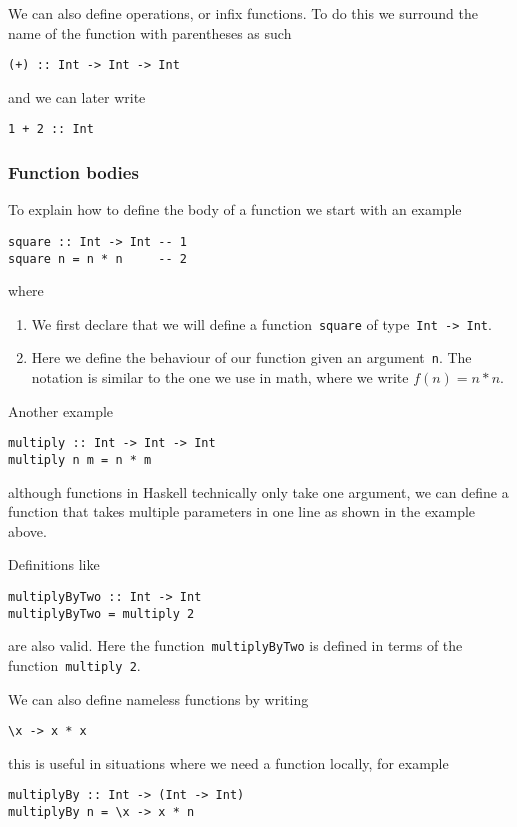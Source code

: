 \documentclass[../TFG.tex]{subfiles}
\begin{document}
We can also define operations, or infix functions. To do this we surround the
name of the function with parentheses as such
\begin{verbatim}
(+) :: Int -> Int -> Int
\end{verbatim}
and we can later write
\begin{verbatim}
1 + 2 :: Int
\end{verbatim}

\subsubsection{Function bodies}
To explain how to define the body of a function we start with an example
\begin{verbatim}
square :: Int -> Int -- 1
square n = n * n     -- 2
\end{verbatim}
where
\begin{enumerate}
    \item We first declare that we will define a
        function~\texttt{square} of
        type~\texttt{Int -> Int}.
    \item Here we define the behaviour of our function given an
        argument~\texttt{n}. The notation is similar to the one
        we use in math, where we write \(f(n) = n*n\).
\end{enumerate}
Another example
\begin{verbatim}
multiply :: Int -> Int -> Int
multiply n m = n * m
\end{verbatim}
although functions in Haskell technically only take one argument, we can define
a function that takes multiple parameters in one line as shown in the example
above.

Definitions like
\begin{verbatim}
multiplyByTwo :: Int -> Int
multiplyByTwo = multiply 2
\end{verbatim}
are also valid. Here the function~\texttt{multiplyByTwo} is defined
in terms of the function~\texttt{multiply 2}.

We can also define nameless functions by writing
\begin{verbatim}
\x -> x * x
\end{verbatim}
this is useful in situations where we need a function locally, for example
\begin{verbatim}
multiplyBy :: Int -> (Int -> Int)
multiplyBy n = \x -> x * n
\end{verbatim}
\end{document}

